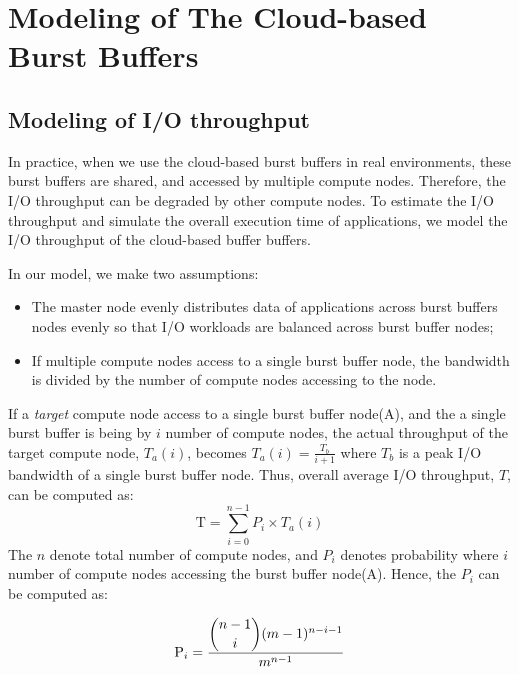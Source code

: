 \section{Modeling of The Cloud-based Burst Buffers}
\label{sec:modeling}
\subsection{Modeling of I/O throughput}
In practice, when we use the cloud-based burst buffers in real environments,
these burst buffers are shared, and accessed by multiple compute nodes.
Therefore, the I/O throughput can be degraded by other compute nodes.
To estimate the I/O throughput and simulate the overall execution
time of applications, we model the I/O throughput of the cloud-based buffer
buffers.

In our model, we make two assumptions: 
\begin{itemize}
  \item The master node evenly distributes data of applications across burst
  buffers nodes evenly so that I/O workloads are balanced across
  burst buffer nodes;
  \item If multiple compute nodes access to a single burst buffer node, the
  bandwidth is divided by the number of compute nodes accessing to the node.
\end{itemize}
If a \emph{target} compute node access to a single burst buffer node(A), and the  
a single burst buffer is being by $i$ number of compute nodes, the actual
throughput of the target compute node, $T_{a}(i)$, becomes
$T_{a}(i)=\frac{T_{b}}{i+1}$ where $T_{b}$ is a peak I/O bandwidth of a single
burst buffer node. Thus, overall average I/O throughput, $T$, can be computed as:
\begin{equation}
\text{T}=\sum_{i=0}^{n-1} P_{i} \times T_{a}(i)\label{model:throughput}
\end{equation}
The $n$ denote total number of compute nodes, and $P_{i}$ denotes probability
where $i$ number of compute nodes accessing the burst buffer node(A). 
Hence, the $P_{i}$ can be computed as:


\begin{equation}
\text{P}_i=\frac{\dbinom{n-1}{i}(m-1)^{n-i-1}}{m^{n-1}}
\end{equation}

